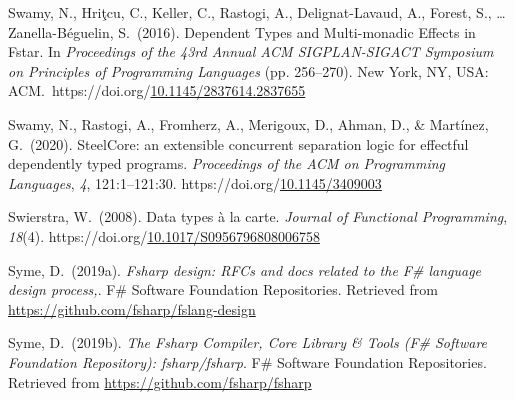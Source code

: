 \documentclass[12pt,twoside]{article}
\begin{document}
{\begin{thebibliography}{1079}
\mdbibitemlabel{}Swamy, N., Hriţcu, C., Keller, C., Rastogi, A., Delignat-Lavaud, A., Forest, S., … Zanella-Béguelin, S.~(2016). Dependent Types and Multi-monadic Effects in Fstar. In \emph{Proceedings of the 43rd Annual ACM SIGPLAN-SIGACT Symposium on Principles of Programming Languages} (pp. 256–270). New York, NY, USA: ACM.~https://doi.org/\href{https://dx.doi.org/10.1145/2837614.2837655}{10.1145/2837614.2837655}%

\mdbibitemlabel{}Swamy, N., Rastogi, A., Fromherz, A., Merigoux, D., Ahman, D., \& Martínez, G.~(2020). SteelCore: an extensible concurrent separation logic for effectful dependently typed programs. \emph{Proceedings of the ACM on Programming Languages}, \emph{4}, 121:1–121:30. https://doi.org/\href{https://dx.doi.org/10.1145/3409003}{10.1145/3409003}%

\mdbibitemlabel{}Swierstra, W.~(2008). Data types à la carte. \emph{Journal of Functional Programming}, \emph{18}(4). https://doi.org/\href{https://dx.doi.org/10.1017/S0956796808006758}{10.1017/S0956796808006758}%

\mdbibitemlabel{}Syme, D.~(2019a). \emph{Fsharp design: RFCs and docs related to the F\# language design process,}. F\# Software Foundation Repositories. Retrieved from \href{https://github.com/fsharp/fslang-design}{{\ttfamily https://\hspace{0pt}github.\hspace{0pt}com/\hspace{0pt}fsharp/\hspace{0pt}fslang-\hspace{0pt}design}}%

\mdbibitemlabel{}Syme, D.~(2019b). \emph{The Fsharp Compiler, Core Library \& Tools (F\# Software Foundation Repository): fsharp/fsharp}. F\# Software Foundation Repositories. Retrieved from \href{https://github.com/fsharp/fsharp}{{\ttfamily https://\hspace{0pt}github.\hspace{0pt}com/\hspace{0pt}fsharp/\hspace{0pt}fsharp}}%


\end{thebibliography}}
\end{document}
